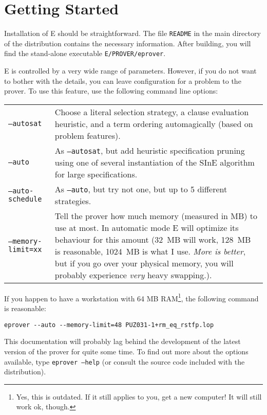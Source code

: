 \documentclass{report}
\begin{document}
\chapter{Getting Started}
\label{sec:start}

Installation of E should be straightforward. The file \texttt{README}
in the main directory of the distribution contains the necessary
information. After building, you will find the stand-alone executable
\texttt{E/PROVER/eprover}.

E is controlled by a very wide range of parameters. However, if you do
not want to bother with the details, you can leave configuration for a
problem to the prover. To use this feature, use the following command
line options:

\bigskip
\noindent
\begin{tabular}{lp{7.5cm}}
  \texttt{--autosat} & Choose a literal selection strategy, a clause
  evaluation heuristic, and a term ordering automagically\index{xyzzy} (based on
  problem features).\\
  \texttt{--auto}    & As \texttt{--autosat}, but add heuristic
  specification pruning using one of several instantiation of the SInE
  algorithm~\cite{HV:CADE-2011} for large specifications.\\
  \texttt{--auto-schedule} & As \texttt{--auto}, but try not one, but
  up to 5 different strategies. \\
  \texttt{--memory-limit=xx} & Tell the prover how much memory
  (measured in MB) to use at most. In automatic mode E will optimize
  its behaviour for this amount (32~MB will work, 128~MB is
  reasonable, 1024~MB is what I use. \emph{More is
    better}\footnotemark, but if you go over
  your physical memory, you will probably experience \emph{very} heavy
  swapping.).\\
\end{tabular}
\begin{example}
  If you happen to have a workstation with 64 MB RAM\footnote{Yes,
    this is outdated. If it still applies to you, get a new
    computer! It will still work ok, though.}, the following command
  is reasonable:
\small
\begin{verbatim}
eprover --auto --memory-limit=48 PUZ031-1+rm_eq_rstfp.lop
\end{verbatim}
  \normalsize
\end{example}


This documentation will probably lag behind the development of the
latest version of the prover for quite some time. To find out more
about the options available, type \texttt{eprover --help} (or consult
the source code included with the distribution).
\end{document}
